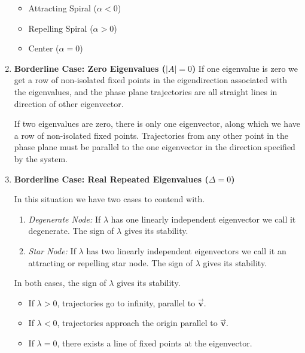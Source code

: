 \documentclass[12pt, landscape, twocolumn]{article}
\let\oldvec\vec
\renewcommand{\vec}[1]{\oldvec{\mathbf{ #1 } } }                    %
\begin{document}
\begin{enumerate}
                \begin{itemize}
                    \item Attracting Spiral ($\alpha < 0$)
                    \item Repelling Spiral ($\alpha > 0$)
                    \item Center ($\alpha = 0$)
                \end{itemize}

            \item \textbf{Borderline Case: Zero Eigenvalues ($|A| = 0$)}
                If one eigenvalue is zero we get a row of non-isolated fixed points in the eigendirection associated with the eigenvalues, and the phase plane trajectories are all straight lines in direction of other eigenvector.

                If two eigenvalues are zero, there is only one eigenvector, along which we have a row of non-isolated fixed points. Trajectories from any other point in the phase plane must be parallel to the one eigenvector in the direction specified by the system.

            \item \textbf{Borderline Case: Real Repeated Eigenvalues ($\Delta = 0$)}

                In this situation we have two cases to contend with.

                \begin{enumerate}
                    \item \textit{Degenerate Node:} If $\lambda$ has one linearly independent eigenvector we call it degenerate. The sign of $\lambda$ gives its stability.
                    \item \textit{Star Node:} If $\lambda$ has two linearly independent eigenvectors we call it an attracting or repelling star node. The sign of $\lambda$ gives its stability.
                \end{enumerate}

                In both cases, the sign of $\lambda$ gives its stability.

                    \begin{itemize}
                        \item If $\lambda > 0$, trajectories go to infinity, parallel to $\vec{v}$.
                        \item If $\lambda < 0$, trajectories approach the origin parallel to $\vec{v}$.
                        \item If $\lambda = 0$, there exists a line of fixed points at the eigenvector.
                    \end{itemize}
    \end{enumerate}
\end{document}
